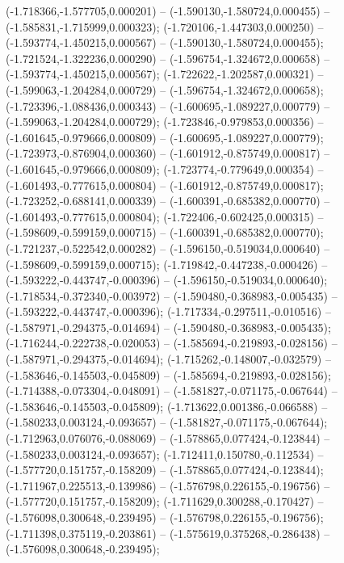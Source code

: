  (-1.718366,-1.577705,0.000201) -- (-1.590130,-1.580724,0.000455) -- (-1.585831,-1.715999,0.000323);
 (-1.720106,-1.447303,0.000250) -- (-1.593774,-1.450215,0.000567) -- (-1.590130,-1.580724,0.000455);
 (-1.721524,-1.322236,0.000290) -- (-1.596754,-1.324672,0.000658) -- (-1.593774,-1.450215,0.000567);
 (-1.722622,-1.202587,0.000321) -- (-1.599063,-1.204284,0.000729) -- (-1.596754,-1.324672,0.000658);
 (-1.723396,-1.088436,0.000343) -- (-1.600695,-1.089227,0.000779) -- (-1.599063,-1.204284,0.000729);
 (-1.723846,-0.979853,0.000356) -- (-1.601645,-0.979666,0.000809) -- (-1.600695,-1.089227,0.000779);
 (-1.723973,-0.876904,0.000360) -- (-1.601912,-0.875749,0.000817) -- (-1.601645,-0.979666,0.000809);
 (-1.723774,-0.779649,0.000354) -- (-1.601493,-0.777615,0.000804) -- (-1.601912,-0.875749,0.000817);
 (-1.723252,-0.688141,0.000339) -- (-1.600391,-0.685382,0.000770) -- (-1.601493,-0.777615,0.000804);
 (-1.722406,-0.602425,0.000315) -- (-1.598609,-0.599159,0.000715) -- (-1.600391,-0.685382,0.000770);
 (-1.721237,-0.522542,0.000282) -- (-1.596150,-0.519034,0.000640) -- (-1.598609,-0.599159,0.000715);
 (-1.719842,-0.447238,-0.000426) -- (-1.593222,-0.443747,-0.000396) -- (-1.596150,-0.519034,0.000640);
 (-1.718534,-0.372340,-0.003972) -- (-1.590480,-0.368983,-0.005435) -- (-1.593222,-0.443747,-0.000396);
 (-1.717334,-0.297511,-0.010516) -- (-1.587971,-0.294375,-0.014694) -- (-1.590480,-0.368983,-0.005435);
 (-1.716244,-0.222738,-0.020053) -- (-1.585694,-0.219893,-0.028156) -- (-1.587971,-0.294375,-0.014694);
 (-1.715262,-0.148007,-0.032579) -- (-1.583646,-0.145503,-0.045809) -- (-1.585694,-0.219893,-0.028156);
 (-1.714388,-0.073304,-0.048091) -- (-1.581827,-0.071175,-0.067644) -- (-1.583646,-0.145503,-0.045809);
 (-1.713622,0.001386,-0.066588) -- (-1.580233,0.003124,-0.093657) -- (-1.581827,-0.071175,-0.067644);
 (-1.712963,0.076076,-0.088069) -- (-1.578865,0.077424,-0.123844) -- (-1.580233,0.003124,-0.093657);
 (-1.712411,0.150780,-0.112534) -- (-1.577720,0.151757,-0.158209) -- (-1.578865,0.077424,-0.123844);
 (-1.711967,0.225513,-0.139986) -- (-1.576798,0.226155,-0.196756) -- (-1.577720,0.151757,-0.158209);
 (-1.711629,0.300288,-0.170427) -- (-1.576098,0.300648,-0.239495) -- (-1.576798,0.226155,-0.196756);
 (-1.711398,0.375119,-0.203861) -- (-1.575619,0.375268,-0.286438) -- (-1.576098,0.300648,-0.239495);
